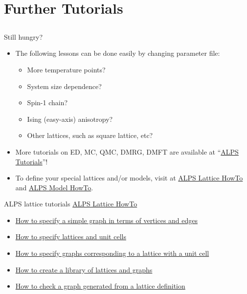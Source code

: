 \section{Further Tutorials}
\subsection*{\redm\whiteb\greenb}

\begin{frame}[t,fragile]{Still hungry?}
  \begin{itemize}
  \item The following lessons can be done easily by changing parameter file:
    \begin{itemize}
    \item More temperature points?
    \item System size dependence?
    \item Spin-1 chain?
    \item Ising (easy-axis) anisotropy?
    \item Other lattices, such as square lattice, etc?
    \end{itemize}
  \item More tutorials on ED, MC, QMC, DMRG, DMFT are available at ``\href{http://alps.comp-phys.org/mediawiki/index.php/ALPS_2_Tutorials:Overview}{ALPS Tutorials}''!
  \item To define your special lattices and/or models, visit at \href{http://alps.comp-phys.org/mediawiki/index.php/Tutorials:LatticeHOWTO}{ALPS Lattice HowTo} and \href{http://alps.comp-phys.org/mediawiki/index.php/Tutorials:ModelHOWTO}{ALPS Model HowTo}.
  \end{itemize}
\end{frame}

\begin{frame}[t,fragile]{ALPS lattice tutorials}
  \href{http://alps.comp-phys.org/mediawiki/index.php/Tutorials:LatticeHOWTO}{ALPS Lattice HowTo} \\
  \begin{itemize}
    \item \href{http://alps.comp-phys.org/mediawiki/index.php/Tutorials:LatticeHOWTO:SimpleGraphs}{How to specify a simple graph in terms of vertices and edges}
    \item \href{http://alps.comp-phys.org/mediawiki/index.php/Tutorials:LatticesAndUnitCells}{How to specify lattices and unit cells}
    \item \href{http://alps.comp-phys.org/mediawiki/index.php/Tutorials:LatticesAndGraphs}{How to specify graphs corresponding to a lattice with a unit cell}
    \item \href{http://alps.comp-phys.org/mediawiki/index.php/Tutorials:LatticeHOWTO:Library}{How to create a library of lattices and graphs}
    \item \href{http://alps.comp-phys.org/mediawiki/index.php/Tutorials:LatticeHowto:CheckLattice}{How to check a graph generated from a lattice definition}
  \end{itemize}
\end{frame}


